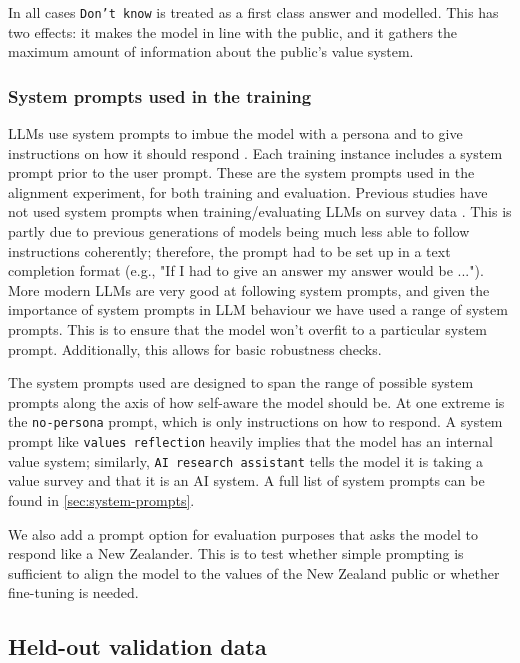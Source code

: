 In all cases \texttt{Don't know} is treated as a first class answer and modelled. This has two effects: it makes the model  in line with the public, and it gathers the maximum amount of information about the public's value system.

\subsubsection{System prompts used in the training}

LLMs use system prompts to imbue the model with a persona and to give instructions on how it should respond \cite{brownLanguageModelsAre2020,salewskiInContextImpersonationReveals2023}. Each training instance includes a system prompt prior to the user prompt. These are the system prompts used in the alignment experiment, for both training and evaluation. Previous studies have not used system prompts when training/evaluating LLMs on survey data \cite{durmusMeasuringRepresentationSubjective2024,caoSpecializingLargeLanguage2025,nieSurveytoBehaviorDownstreamAlignment2025}. This is partly due to previous generations of models being much less able to follow instructions coherently; therefore, the prompt had to be set up in a text completion format (e.g., "If I had to give an answer my answer would be ..."). More modern LLMs are very good at following system prompts, and given the importance of system prompts in LLM behaviour we have used a range of system prompts. This is to ensure that the model won't overfit to a particular system prompt. Additionally, this allows for basic robustness checks.

The system prompts used are designed to span the range of possible system prompts along the axis of how self-aware the model should be. At one extreme is the \texttt{no-persona} prompt, which is only instructions on how to respond. A system prompt like \texttt{values reflection} heavily implies that the model has an internal value system; similarly, \texttt{AI research assistant} tells the model it is taking a value survey and that it is an AI system. A full list of system prompts can be found in \ref{sec:system-prompts}.

We also add a prompt option for evaluation purposes that asks the model to respond like a New Zealander. This is to test whether simple prompting is sufficient to align the model to the values of the New Zealand public or whether fine-tuning is needed.


\subsection{Held-out validation data}

